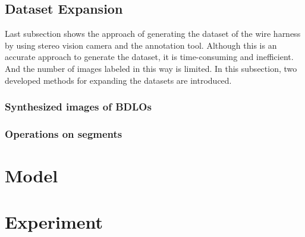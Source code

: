 \subsection{Dataset Expansion}
    Last subsection shows the approach of generating the dataset of the wire harness by using stereo vision camera and the annotation tool. Although this is an accurate approach
    to generate the dataset, it is time-consuming and inefficient. And the number of images labeled in this way is limited. In this subsection, two developed methods for expanding
    the datasets are introduced.
\subsubsection{Synthesized images of BDLOs}
\subsubsection{Operations on segments}
\section{Model}
\section{Experiment}